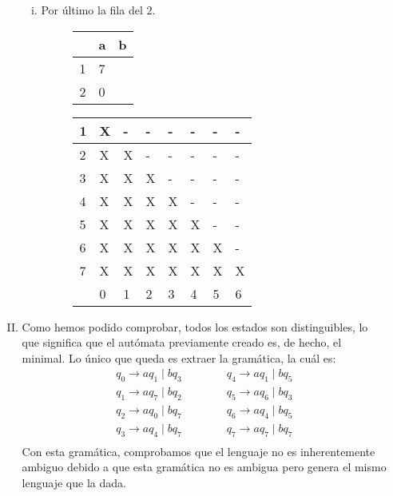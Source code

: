 \documentclass[11pt,a4paper]{article}
\begin{document}
\begin{enumerate}[a)]
\begin{enumerate}[I.]
\begin{enumerate}[i.]
				\item Por último la fila del $2$.
				\begin{figure}[H]
				\centering
					\begin{tabular}{l|ll}
					  & a & b \\ \hline
					1 & 7 &   \\
					2 & 0 &   \\ 
					\end{tabular}
				\end{figure}
				\begin{figure}[H]
				\centering
					\begin{tabular}{|l|l|l|l|l|l|l|l|}
					\hline
					1 & X & - & - & - & - & - & - \\ \hline
					2 & X & X & - & - & - & - & - \\ \hline
					3 & X & X & X & - & - & - & - \\ \hline
					4 & X & X & X & X & - & - & - \\ \hline
					5 &	X & X & X & X & X & - & - \\ \hline
					6 & X & X & X & X & X & X & - \\ \hline
					7 & X & X & X & X & X & X & X \\ \hline
			  		  & 0 & 1 & 2 & 3 & 4 & 5 & 6 \\ \hline
					\end{tabular}
				\end{figure}
			\end{enumerate}
			\item Como hemos podido comprobar, todos los estados son distinguibles, lo que significa que el autómata previamente creado es, de hecho, el minimal. Lo único que queda es extraer la gramática, la cuál es:
			\[\begin{array}{c}
		q_0\rightarrow aq_1\mid bq_3 \qquad \qquad q_4\rightarrow aq_1\mid bq_5\\
		q_1\rightarrow aq_7\mid bq_2 \qquad \qquad q_5\rightarrow aq_6\mid bq_3\\
		q_2\rightarrow aq_0\mid bq_7 \qquad \qquad q_6\rightarrow aq_4\mid bq_5\\
		q_3\rightarrow aq_4\mid bq_7 \qquad \qquad q_7\rightarrow aq_7\mid bq_7\\
	\end{array}\]
			Con esta gramática, comprobamos que el lenguaje no es inherentemente ambiguo debido a que esta gramática no es ambigua pero genera el mismo lenguaje que la dada.
	\end{enumerate}
	

\end{enumerate}
\end{document}
